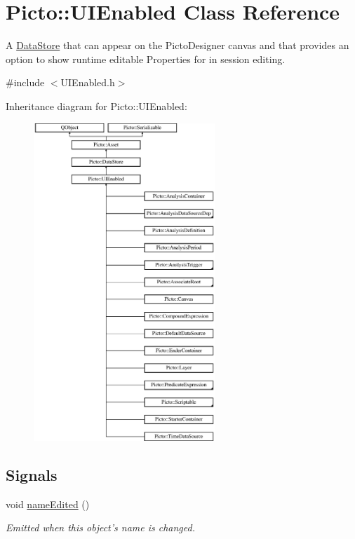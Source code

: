 \hypertarget{class_picto_1_1_u_i_enabled}{\section{Picto\-:\-:U\-I\-Enabled Class Reference}
\label{class_picto_1_1_u_i_enabled}
}


A \hyperlink{class_picto_1_1_data_store}{Data\-Store} that can appear on the Picto\-Designer canvas and that provides an option to show runtime editable Properties for in session editing.  




{\ttfamily \#include $<$U\-I\-Enabled.\-h$>$}

Inheritance diagram for Picto\-:\-:U\-I\-Enabled\-:\begin{figure}[H]
\begin{center}
\leavevmode
\includegraphics[height=12.000000cm]{class_picto_1_1_u_i_enabled}
\end{center}
\end{figure}
\subsection*{Signals}
\begin{DoxyCompactItemize}
\item 
\hypertarget{class_picto_1_1_u_i_enabled_a323aef51f96a9a8a6102e768add07226}{void \hyperlink{class_picto_1_1_u_i_enabled_a323aef51f96a9a8a6102e768add07226}{name\-Edited} ()}\label{class_picto_1_1_u_i_enabled_a323aef51f96a9a8a6102e768add07226}

\begin{DoxyCompactList}\small\item\em Emitted when this object's name is changed. \end{DoxyCompactList}\end{DoxyCompactItemize}
